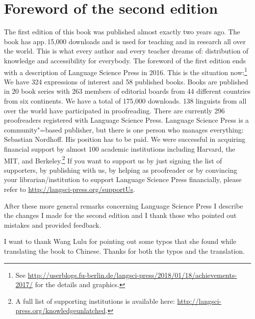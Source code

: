 
\section*{Foreword of the second edition}

The first edition of this book was published almost exactly two years ago. The book has app.\,15,000
downloads and is used for teaching and in research all over the world. This is what every author and
every teacher dreams of: distribution of knowledge and accessibility for everybody. The foreword of
the first edition ends with a description of Language Science Press in 2016. This is the situation
now:\footnote{%
  See \url{http://userblogs.fu-berlin.de/langsci-press/2018/01/18/achievements-2017/} for the
  details and graphics.
} We have 324 expressions of interest and 58 published books. Books are published in 20 book series with 263 members of editorial boards from 44
different countries from six continents. We have a total of 175,000 downloads. 138 linguists from
all over the world have participated in proofreading. There are currently 296 proofreaders
registered with Language Science Press. Language Science Press is a community"=based publisher, but
there is one person who manages everything: Sebastian Nordhoff. His
position has to be paid. We were successful in acquiring financial support by almost 100 academic institutions including 
Harvard, the MIT, and Berkeley.\footnote{%
  A full list of supporting institutions is available here:
  \url{http://langsci-press.org/knowledgeunlatched}.
}
If you want to support us by just signing the list of supporters, by publishing with us, by helping as proofreader or by
convincing your librarian/institution to support Language Science Press financially, please refer to \url{http://langsci-press.org/supportUs}.



After these more general remarks concerning Language Science Press I describe the changes I made for the second edition and I
thank those who pointed out mistakes and provided feedback.

I want to thank Wang Lulu for pointing out some typos that she found while translating the book to
Chinese. Thanks for both the typos and the translation.

